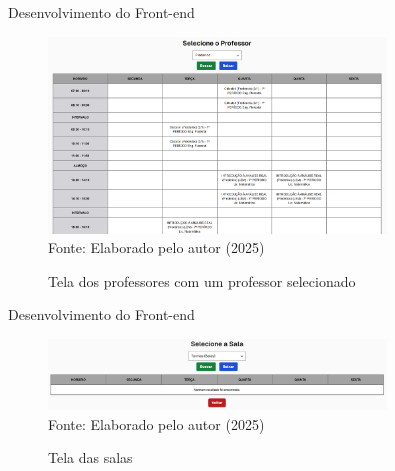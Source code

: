 \begin{frame}{Desenvolvimento do Front-end}
    \begin{figure}
        \centering
        \vspace{-0.5cm}
        \caption{Tela dos professores com um professor selecionado}
        \vspace{-0.2cm}
        \includegraphics[width=0.8\textwidth]{figuras/front-6.png}
        \\ %
        \small Fonte: Elaborado pelo autor (2025)
    \end{figure}
\end{frame}

\begin{frame}{Desenvolvimento do Front-end}
    \begin{figure}
        \centering
        \vspace{-0.5cm}
        \caption{Tela das salas}
        \vspace{-0.2cm}
        \includegraphics[width=0.8\textwidth]{figuras/front-7.png}
        \\ %
        \small Fonte: Elaborado pelo autor (2025)
    \end{figure}
\end{frame}

